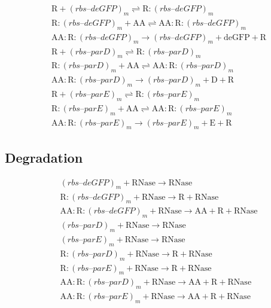 \documentclass[english]{report}
\begin{document}
\begin{align}
& \mathrm{R} + (rbs\textrm{--}deGFP)_m \rightleftharpoons \mathrm{R}\!:\!(rbs\textrm{--}deGFP)_m \\
& \mathrm{R}\!:\!(rbs\textrm{--}deGFP)_m + \mathrm{AA} \rightleftharpoons \mathrm{AA}\!:\!\mathrm{R}\!:\!(rbs\textrm{--}deGFP)_m \\
& \mathrm{AA}\!:\!\mathrm{R}\!:\!(rbs\textrm{--}deGFP)_m \rightarrow (rbs\textrm{--}deGFP)_m + \mathrm{deGFP} + \mathrm{R} \\
& \mathrm{R} + (rbs\textrm{--}parD)_m \rightleftharpoons \mathrm{R}\!:\!(rbs\textrm{--}parD)_m \\
& \mathrm{R}\!:\!(rbs\textrm{--}parD)_m + \mathrm{AA} \rightleftharpoons \mathrm{AA}\!:\!\mathrm{R}\!:\!(rbs\textrm{--}parD)_m \\
& \mathrm{AA}\!:\!\mathrm{R}\!:\!(rbs\textrm{--}parD)_m \rightarrow (rbs\textrm{--}parD)_m + \mathrm{D} + \mathrm{R} \\
& \mathrm{R} + (rbs\textrm{--}parE)_m \rightleftharpoons \mathrm{R}\!:\!(rbs\textrm{--}parE)_m \\
& \mathrm{R}\!:\!(rbs\textrm{--}parE)_m + \mathrm{AA} \rightleftharpoons \mathrm{AA}\!:\!\mathrm{R}\!:\!(rbs\textrm{--}parE)_m \\
& \mathrm{AA}\!:\!\mathrm{R}\!:\!(rbs\textrm{--}parE)_m \rightarrow (rbs\textrm{--}parE)_m + \mathrm{E} + \mathrm{R} 
\end{align}

\subsection{Degradation}

\begin{align}
& (rbs\textrm{--}deGFP)_m + \mathrm{RNase} \rightarrow  \mathrm{RNase} \\
& \mathrm{R}\!:\!(rbs\textrm{--}deGFP)_m + \mathrm{RNase} \rightarrow \mathrm{R} + \mathrm{RNase} \\
& \mathrm{AA}\!:\!\mathrm{R}\!:\!(rbs\textrm{--}deGFP)_m + \mathrm{RNase} \rightarrow \mathrm{AA} + \mathrm{R} + \mathrm{RNase} \\
& (rbs\textrm{--}parD)_m + \mathrm{RNase} \rightarrow  \mathrm{RNase} \\
& (rbs\textrm{--}parE)_m + \mathrm{RNase} \rightarrow  \mathrm{RNase} \\
& \mathrm{R}\!:\!(rbs\textrm{--}parD)_m + \mathrm{RNase} \rightarrow \mathrm{R} + \mathrm{RNase} \\
& \mathrm{R}\!:\!(rbs\textrm{--}parE)_m + \mathrm{RNase} \rightarrow \mathrm{R} + \mathrm{RNase} \\
& \mathrm{AA}\!:\!\mathrm{R}\!:\!(rbs\textrm{--}parD)_m + \mathrm{RNase} \rightarrow \mathrm{AA} + \mathrm{R} + \mathrm{RNase} \\
& \mathrm{AA}\!:\!\mathrm{R}\!:\!(rbs\textrm{--}parE)_m + \mathrm{RNase} \rightarrow \mathrm{AA} + \mathrm{R} + \mathrm{RNase}
\end{align}
\end{document}
